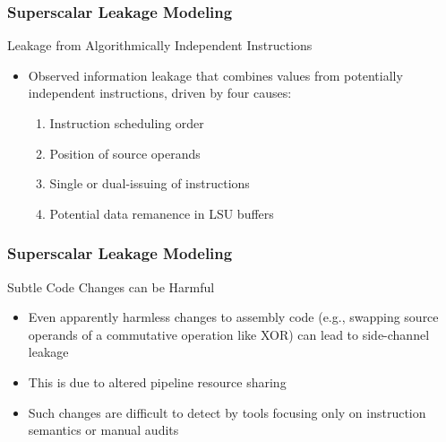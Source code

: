 \begin{frame}
    \frametitle{Superscalar Leakage Modeling}
    \begin{block}{Leakage from Algorithmically Independent Instructions}
        \begin{itemize}
            \item Observed information leakage that combines values from potentially independent instructions, driven by four causes:
                \begin{enumerate}
                    \item Instruction scheduling order
                    \item Position of source operands
                    \item Single or dual-issuing of instructions
                    \item Potential data remanence in LSU buffers
                \end{enumerate}
        \end{itemize}
    \end{block}
\end{frame}
\begin{frame}
    \frametitle{Superscalar Leakage Modeling}
    \begin{block}{Subtle Code Changes can be Harmful}
        \begin{itemize}
            \item Even apparently harmless changes to assembly code (e.g., swapping source operands of a commutative operation like XOR) can lead to side-channel leakage
            \item This is due to altered pipeline resource sharing
            \item Such changes are difficult to detect by tools focusing only on instruction semantics or manual audits
        \end{itemize}
    \end{block}
\end{frame}

